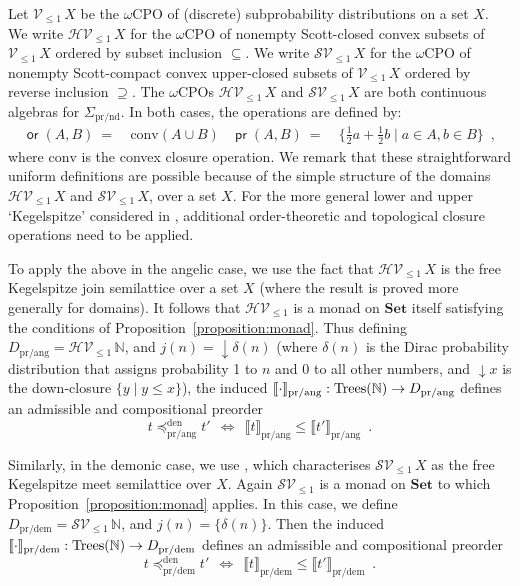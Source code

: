 \documentclass[a4paper,UKenglish]{lipics-v2018}
\newcommand{\Nat}{\mathbb{N}}
\newcommand{\Tree}{\textnormal{Trees}} %
\newcommand{\Basicleq}{\preccurlyeq}
\newcommand{\prEff}{\operatorname{\textsf{pr}}}
\newcommand{\orEff}{\operatorname{\textsf{or}}}
\newcommand{\prnd}{\text{pr/nd}}
\newcommand{\prang}{\text{pr/ang}}
\newcommand{\prdem}{\text{pr/dem}}
\newcommand{\Den}{\text{den}}
\newcommand{\Sem}[1]{\llbracket #1 \rrbracket}
\newcommand{\Set}{\mathbf{Set}}
\newcommand{\Conv}{\text{conv}}
\theoremstyle{plain}
\begin{document}
Let $\mathcal{V}_{\leq 1} \,X$ be the $\omega$CPO of (discrete) subprobability distributions on a set $X$.
We write $\mathcal{H}\mathcal{V}_{\leq 1} \,X$ for the $\omega$CPO of nonempty Scott-closed convex subsets
of  $\mathcal{V}_{\leq 1} \,X$  ordered by subset inclusion $\subseteq$. 
We write $\mathcal{S}\mathcal{V}_{\leq 1} \,X$ for the $\omega$CPO of nonempty Scott-compact convex upper-closed subsets
of  $\mathcal{V}_{\leq 1} \,X$  ordered by reverse inclusion $\supseteq$.
The $\omega$CPOs $\mathcal{H}\mathcal{V}_{\leq 1} \,X$ and $\mathcal{S}\mathcal{V}_{\leq 1} \,X$ are both continuous algebras for $\Sigma_\prnd$. In both cases, the operations are defined by:
\begin{align*}
\orEff(A,B) ~ = ~ & \Conv(A \cup B)  
& 
\prEff(A,B) ~ = ~ & \{\frac{1}{2}a + \frac{1}{2}b \mid a \in A, b \in B\} \enspace ,
\end{align*}
where $\Conv$ is the convex closure operation. 
We remark that these straightforward uniform definitions are possible because of the simple structure of the 
domains  $\mathcal{H}\mathcal{V}_{\leq 1} \,X$ and $\mathcal{S}\mathcal{V}_{\leq 1} \,X$, over a set $X$. For the more general 
lower and upper `Kegelspitze' considered in \cite{KeimelP2016}, additional order-theoretic and topological closure operations need to be applied.

To apply the above in the angelic case, we use the fact that $\mathcal{H}\mathcal{V}_{\leq 1} \,X$  is the free 
Kegelspitze join semilattice over a set $X$  \cite[Corollary 3.15]{KeimelP2016} (where the result is proved more generally for domains). It follows that $\mathcal{H}\mathcal{V}_{\leq 1} $ is
a monad on  $\Set$ itself  satisfying the conditions
of Proposition~\ref{proposition:monad}. Thus defining 
$D_\prang = \mathcal{H}\mathcal{V}_{\leq 1} \,\mathbb{N}$, and
$j(n) = \downarrow\!\delta(n)$ (where $\delta(n)$ is the Dirac probability distribution that assigns probability 1 to $n$ and $0$ to all other numbers, and $\downarrow\!x$ is the down-closure $\{y \mid y \leq x\}$), the induced $\Sem{\cdot}_\prang : \Tree(\Nat) \to  D_\prang$ defines an admissible and compositional preorder
\[
t \Basicleq^\Den_\prang t' ~~ \Leftrightarrow ~~ \Sem{t}_\prang  \leq \Sem{t'}_\prang \enspace .
\]

Similarly, in the demonic case, we use \cite[Corollary 3.16]{KeimelP2016}, which characterises $\mathcal{S}\mathcal{V}_{\leq 1} \,X$ as the free Kegelspitze meet semilattice over $X$. Again $\mathcal{S}\mathcal{V}_{\leq 1}$ is a monad
on  $\Set$ to which Proposition~\ref{proposition:monad} applies. In this case, we define 
$D_\prdem = \mathcal{S}\mathcal{V}_{\leq 1} \,\mathbb{N}$, and
$j(n) = \{\delta(n)\}$. Then the induced $\Sem{\cdot}_\prdem : \Tree(\Nat) \to  D_\prdem$ defines an admissible and compositional preorder
\[
t \Basicleq^\Den_\prdem t' ~~ \Leftrightarrow ~~ \Sem{t}_\prdem  \leq \Sem{t'}_\prdem \enspace .
\]
\end{document}
